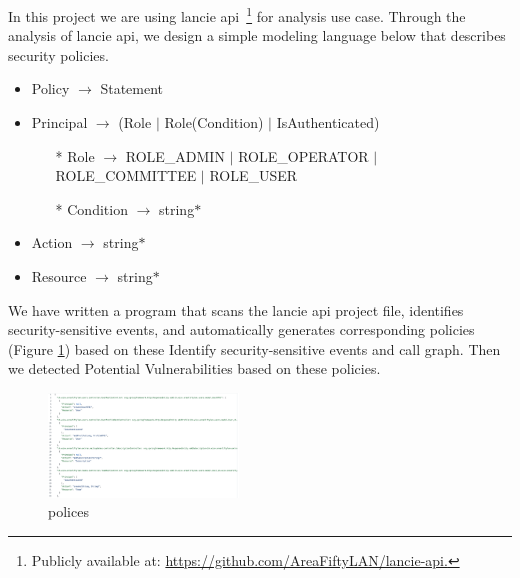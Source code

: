 In this project we are using lancie api~\footnote{Publicly available at:
  \url{https://github.com/AreaFiftyLAN/lancie-api.}} for analysis use case.
%
Through the analysis of lancie api, we design a simple modeling language below
that describes security policies.
\begin{itemize}
  \item Policy $\rightarrow$ Statement
  \item Principal $\rightarrow$ (Role $|$ Role(Condition) $|$ IsAuthenticated)
        \begin{itemize}
          \item[*] Role $\rightarrow$ ROLE\_ADMIN $|$ ROLE\_OPERATOR $|$ ROLE\_COMMITTEE $|$ ROLE\_USER
          \item[*] Condition $\rightarrow$ string$*$
        \end{itemize}
  \item Action $\rightarrow$ string$*$
  \item Resource $\rightarrow$ string$*$
\end{itemize}

We have written a program that scans the lancie api project file, identifies
security-sensitive events, and automatically generates corresponding
policies (Figure \ref{fig:policies}) based on these Identify security-sensitive
events and call graph. Then we detected Potential Vulnerabilities based on these
policies.
\begin{figure}[htp]
  \centering
  \includegraphics[width=0.45\textwidth]{img/policies.png}
  \caption{polices}
  \label{fig:policies}
\end{figure}


